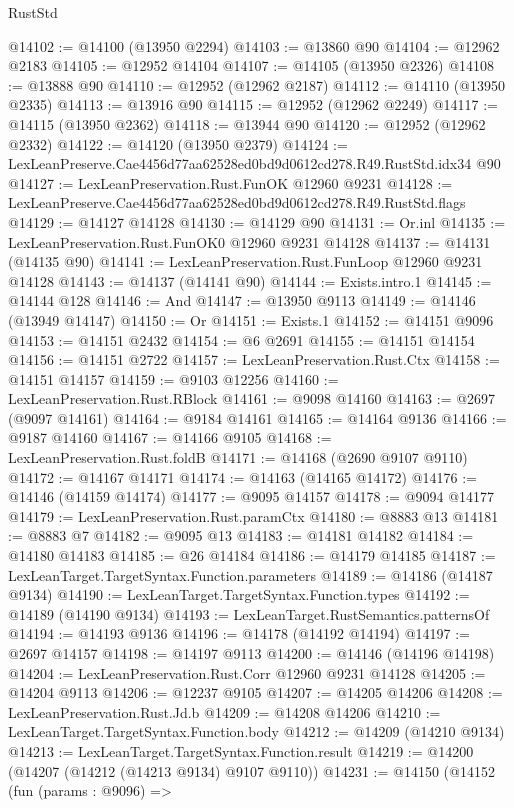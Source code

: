 \begin{lexlean}{RustStd}
\begin{coremodule}
@14102 := @14100 (@13950 @2294)
@14103 := @13860 @90
@14104 := @12962 @2183
@14105 := @12952 @14104
@14107 := @14105 (@13950 @2326)
@14108 := @13888 @90
@14110 := @12952 (@12962 @2187)
@14112 := @14110 (@13950 @2335)
@14113 := @13916 @90
@14115 := @12952 (@12962 @2249)
@14117 := @14115 (@13950 @2362)
@14118 := @13944 @90
@14120 := @12952 (@12962 @2332)
@14122 := @14120 (@13950 @2379)
@14124 := LexLeanPreserve.Cae4456d77aa62528ed0bd9d0612cd278.R49.RustStd.idx34 @90
@14127 := LexLeanPreservation.Rust.FunOK @12960 @9231
@14128 := LexLeanPreserve.Cae4456d77aa62528ed0bd9d0612cd278.R49.RustStd.flags
@14129 := @14127 @14128
@14130 := @14129 @90
@14131 := Or.inl
@14135 := LexLeanPreservation.Rust.FunOK0 @12960 @9231 @14128
@14137 := @14131 (@14135 @90)
@14141 := LexLeanPreservation.Rust.FunLoop @12960 @9231 @14128
@14143 := @14137 (@14141 @90)
@14144 := Exists.intro.{1}
@14145 := @14144 @128
@14146 := And
@14147 := @13950 @9113
@14149 := @14146 (@13949 @14147)
@14150 := Or
@14151 := Exists.{1}
@14152 := @14151 @9096
@14153 := @14151 @2432
@14154 := @6 @2691
@14155 := @14151 @14154
@14156 := @14151 @2722
@14157 := LexLeanPreservation.Rust.Ctx
@14158 := @14151 @14157
@14159 := @9103 @12256
@14160 := LexLeanPreservation.Rust.RBlock
@14161 := @9098 @14160
@14163 := @2697 (@9097 @14161)
@14164 := @9184 @14161
@14165 := @14164 @9136
@14166 := @9187 @14160
@14167 := @14166 @9105
@14168 := LexLeanPreservation.Rust.foldB
@14171 := @14168 (@2690 @9107 @9110)
@14172 := @14167 @14171
@14174 := @14163 (@14165 @14172)
@14176 := @14146 (@14159 @14174)
@14177 := @9095 @14157
@14178 := @9094 @14177
@14179 := LexLeanPreservation.Rust.paramCtx
@14180 := @8883 @13
@14181 := @8883 @7
@14182 := @9095 @13
@14183 := @14181 @14182
@14184 := @14180 @14183
@14185 := @26 @14184
@14186 := @14179 @14185
@14187 := LexLeanTarget.TargetSyntax.Function.parameters
@14189 := @14186 (@14187 @9134)
@14190 := LexLeanTarget.TargetSyntax.Function.types
@14192 := @14189 (@14190 @9134)
@14193 := LexLeanTarget.RustSemantics.patternsOf
@14194 := @14193 @9136
@14196 := @14178 (@14192 @14194)
@14197 := @2697 @14157
@14198 := @14197 @9113
@14200 := @14146 (@14196 @14198)
@14204 := LexLeanPreservation.Rust.Corr @12960 @9231 @14128
@14205 := @14204 @9113
@14206 := @12237 @9105
@14207 := @14205 @14206
@14208 := LexLeanPreservation.Rust.Jd.b
@14209 := @14208 @14206
@14210 := LexLeanTarget.TargetSyntax.Function.body
@14212 := @14209 (@14210 @9134)
@14213 := LexLeanTarget.TargetSyntax.Function.result
@14219 := @14200 (@14207 (@14212 (@14213 @9134) @9107 @9110))
@14231 := @14150
    (@14152
      (fun (params : @9096) =>

\end{coremodule}
\end{lexlean}
